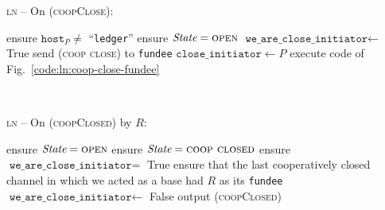 \begin{center}
  \begin{processbox}{\textsc{ln} -- On (\textsc{coopClose}):}
    \begin{algorithmic}[1]
      \State ensure $\texttt{host}_P \neq$ ``\texttt{ledger}''
      \State ensure $\itistate = \textsc{open}$
      \State $\texttt{we\_are\_close\_initiator} \gets$ True
       
        \State send (\textsc{coop close}) to \texttt{fundee}
      \Else \: 
        \State $\texttt{close\_initiator} \gets P$
        \State execute code of Fig.~\ref{code:ln:coop-close-fundee}
        \label{code:ln:coop-close:goto}
      \EndIf
    \end{algorithmic}
  \end{processbox}
  \label{code:ln:coop-close}
\end{center} \ \\

\begin{center}
  \begin{processbox}{\textsc{ln} -- On (\textsc{coopClosed}) by $R$:}
    \begin{algorithmic}[1]
       
        \State ensure $\itistate = \textsc{open}$
      \Else \: 
        \State ensure $\itistate = \textsc{coop closed}$
      \EndIf
      \State ensure $\texttt{we\_are\_close\_initiator} =$ True
      \State ensure that the last cooperatively closed channel in which we acted
      as a base had $R$ as its \texttt{fundee}
      \State $\texttt{we\_are\_close\_initiator} \gets$ False
      \State output (\textsc{coopClosed})
    \end{algorithmic}
  \end{processbox}
  \label{code:ln:coop-closed-to-initiator}
\end{center} \ \\

